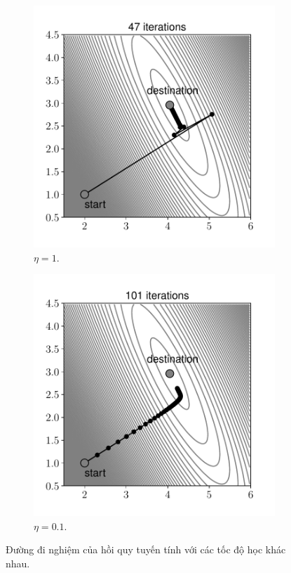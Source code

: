 \begin{figure}[t]
\begin{subfigure}{0.495\textwidth}
\includegraphics[width=0.99\linewidth]{ebookML_src/src/grad_descent/LR_gd_1.pdf}
\caption{$\eta = 1$.}
\label{fig:7_lrgda}
\end{subfigure}
\begin{subfigure}{0.495\textwidth}
\includegraphics[width=0.99\linewidth]{ebookML_src/src/grad_descent/LR_gd_2.pdf}
\caption{$\eta = 0.1$.}
\label{fig:7_lrgdb}
\end{subfigure}
\caption{
Đường đi nghiệm của hồi quy tuyến tính với các tốc độ học khác nhau.
}
\label{fig:7_lrgd}
\end{figure}

